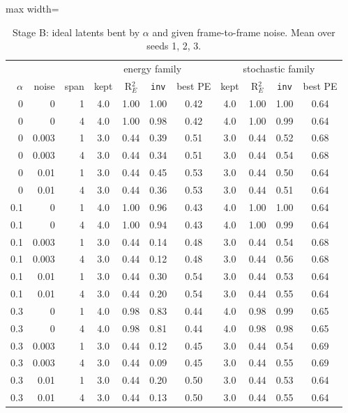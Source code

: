 \begin{table}[t]\centering\small
\caption{Stage B: ideal latents bent by $\alpha$ and given frame-to-frame noise. Mean over seeds 1, 2, 3.}\label{tab:stageB}
\begin{adjustbox}{max width=\linewidth}\begin{tabular}{rrr|cccc|cccc}\toprule
& & & \multicolumn{4}{c|}{energy family} & \multicolumn{4}{c}{stochastic family}\\
$\alpha$ & noise & span & kept & R$^2_E$ & \texttt{inv} & best PE & kept & R$^2_E$ & \texttt{inv} & best PE\\\midrule
0 & 0 & 1 & 4.0 & 1.00 & 1.00 & 0.42 & 4.0 & 1.00 & 1.00 & 0.64\\
0 & 0 & 4 & 4.0 & 1.00 & 0.98 & 0.42 & 4.0 & 1.00 & 0.99 & 0.64\\
0 & 0.003 & 1 & 3.0 & 0.44 & 0.39 & 0.51 & 3.0 & 0.44 & 0.52 & 0.68\\
0 & 0.003 & 4 & 3.0 & 0.44 & 0.34 & 0.51 & 3.0 & 0.44 & 0.54 & 0.68\\
0 & 0.01 & 1 & 3.0 & 0.44 & 0.45 & 0.53 & 3.0 & 0.44 & 0.50 & 0.64\\
0 & 0.01 & 4 & 3.0 & 0.44 & 0.36 & 0.53 & 3.0 & 0.44 & 0.51 & 0.64\\
0.1 & 0 & 1 & 4.0 & 1.00 & 0.96 & 0.43 & 4.0 & 1.00 & 1.00 & 0.64\\
0.1 & 0 & 4 & 4.0 & 1.00 & 0.94 & 0.43 & 4.0 & 1.00 & 0.99 & 0.64\\
0.1 & 0.003 & 1 & 3.0 & 0.44 & 0.14 & 0.48 & 3.0 & 0.44 & 0.54 & 0.68\\
0.1 & 0.003 & 4 & 3.0 & 0.44 & 0.12 & 0.48 & 3.0 & 0.44 & 0.56 & 0.68\\
0.1 & 0.01 & 1 & 3.0 & 0.44 & 0.30 & 0.54 & 3.0 & 0.44 & 0.53 & 0.64\\
0.1 & 0.01 & 4 & 3.0 & 0.44 & 0.20 & 0.54 & 3.0 & 0.44 & 0.55 & 0.64\\
0.3 & 0 & 1 & 4.0 & 0.98 & 0.83 & 0.44 & 4.0 & 0.98 & 0.99 & 0.65\\
0.3 & 0 & 4 & 4.0 & 0.98 & 0.81 & 0.44 & 4.0 & 0.98 & 0.98 & 0.65\\
0.3 & 0.003 & 1 & 3.0 & 0.44 & 0.12 & 0.45 & 3.0 & 0.44 & 0.54 & 0.69\\
0.3 & 0.003 & 4 & 3.0 & 0.44 & 0.09 & 0.45 & 3.0 & 0.44 & 0.55 & 0.69\\
0.3 & 0.01 & 1 & 3.0 & 0.44 & 0.20 & 0.50 & 3.0 & 0.44 & 0.53 & 0.64\\
0.3 & 0.01 & 4 & 3.0 & 0.44 & 0.13 & 0.50 & 3.0 & 0.44 & 0.55 & 0.64\\

\end{tabular}
\end{adjustbox}
\end{table}

